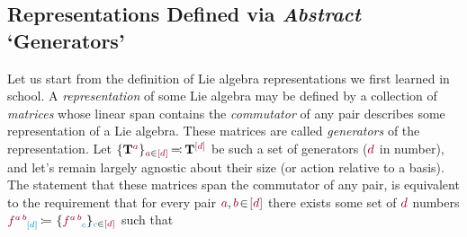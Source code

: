 \documentclass[12pt,a4paper]{article}\let\ifpdf\relax
\begin{document}
\subsection{\texorpdfstring{Representations Defined via \emph{Abstract} `{Generators}'}{Representations Defined via Abstract Generators}}\label{subsec:reps_via_generators}\vspace{-4pt}

Let us start from the definition of Lie algebra representations we first learned in school. A \emph{representation} of some Lie algebra may be defined by a collection of \emph{matrices} whose linear span contains the \emph{commutator} of any pair describes some representation of a Lie algebra. These matrices are called \emph{generators} of the representation. Let $\{\mathbf{T}^\r{a}\}_{\r{a}\in\r{[d]}}\!\equivL\mathbf{T}^{\r{[d]}}$ be such a set of generators ($\r{d}$ in number), and let's remain largely agnostic about their size (or action relative to a basis). The statement that these matrices span the commutator of any pair,
%
%
is equivalent to the requirement that for every pair $\r{a},\r{b}\!\in\!\r{[d]}$ there exists some set of $\r{d}$ numbers $\r{f}\indices{\r{a\,b}}{\t{[d]}}\equivR\{\r{f}\indices{\r{a\,b}}{\t{c}}\}_{\t{c}\in\r{[d]}}$ such that 
%
%
\end{document}

